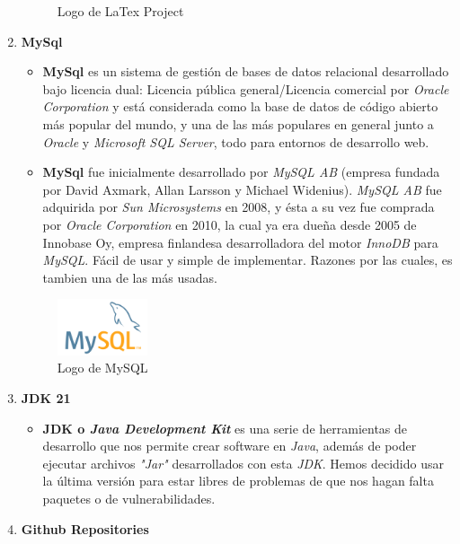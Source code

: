 \documentclass[a4paper]{article}
\begin{document}
\begin{enumerate}
\begin{figure}[!ht]
            \caption{Logo de LaTex Project}
            \label{fig:latexlogo}
        \end{figure}
    \item \textbf{MySql}
          \begin{itemize}
              \item \textbf{MySql} es un sistema de gestión de bases de datos relacional desarrollado bajo licencia dual: Licencia pública general/Licencia comercial por \textit{Oracle Corporation} y está considerada como la base de datos de código abierto más popular del mundo, y una de las más populares en general junto a \textit{Oracle} y \textit{Microsoft SQL Server}, todo para entornos de desarrollo web.
              \item \textbf{MySql} fue inicialmente desarrollado por \textit{MySQL AB} (empresa fundada por David Axmark, Allan Larsson y Michael Widenius). \textit{MySQL AB} fue adquirida por \textit{Sun Microsystems} en 2008, y ésta a su vez fue comprada por \textit{Oracle Corporation} en 2010, la cual ya era dueña desde 2005 de Innobase Oy, empresa finlandesa desarrolladora del motor \textit{InnoDB} para \textit{MySQL}. Fácil de usar y simple de implementar. Razones por las cuales, es tambien una de las más usadas.
          \end{itemize}
          \begin{figure}[!ht]
            \centering
            \includegraphics[width=0.25\textwidth]{Images/MySQL-Logo.png} 
            \caption{Logo de MySQL}
            \label{fig:MYSQLLOGO}
        \end{figure}
    \item \textbf{JDK 21}
          \begin{itemize}
              \item \textbf{JDK o \textit{Java Development Kit}} es una serie de herramientas de desarrollo que nos permite crear software en \textit{Java}, además de poder ejecutar archivos \textit{"Jar"} desarrollados con esta \textit{JDK}. Hemos decidido usar la última versión para estar libres de problemas de que nos hagan falta paquetes o de vulnerabilidades.
          \end{itemize}
    \item \textbf{Github Repositories}
          \begin{itemize}

\end{itemize}
\end{enumerate}
\end{document}
